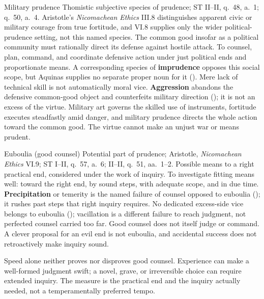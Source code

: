 \virtuedossier
  {Military prudence}
  {Thomistic subjective species of prudence; ST II--II, q.~48, a.~1; q.~50, a.~4. Aristotle's \emph{Nicomachean Ethics} III.8 distinguishes apparent civic or military courage from true fortitude, and VI.8 supplies only the wider political-prudence setting, not this named species.}
  {The common good insofar as a political community must rationally direct its defense against hostile attack.}
  {To counsel, plan, command, and coordinate defensive action under just political ends and proportionate means.}
  {A corresponding species of \textbf{imprudence} opposes this social scope, but Aquinas supplies no separate proper noun for it (). Mere lack of technical skill is not automatically moral vice.}
  {\textbf{Aggression} abandons the defensive common-good object and counterfeits military direction (); it is not an excess of the virtue.}
  {Military art governs the skilled use of instruments, fortitude executes steadfastly amid danger, and military prudence directs the whole action toward the common good. The virtue cannot make an unjust war or means prudent.}


\virtuedossier
  {Euboulia (good counsel)}
  {Potential part of prudence; Aristotle, \emph{Nicomachean Ethics} VI.9; ST I--II, q.~57, a.~6; II--II, q.~51, aa.~1--2.}
  {Possible means to a right practical end, considered under the work of inquiry.}
  {To investigate fitting means well: toward the right end, by sound steps, with adequate scope, and in due time.}
  {\textbf{Precipitation} or temerity is the named failure of counsel opposed to euboulia (); it rushes past steps that right inquiry requires.}
  {No dedicated excess-side vice belongs to euboulia (); vacillation is a different failure to reach judgment, not perfected counsel carried too far.}
  {Good counsel does not itself judge or command. A clever proposal for an evil end is not euboulia, and accidental success does not retroactively make inquiry sound.}

Speed alone neither proves nor disproves good counsel. Experience can make a well-formed judgment swift; a novel, grave, or irreversible choice can require extended inquiry. The measure is the practical end and the inquiry actually needed, not a temperamentally preferred tempo.

